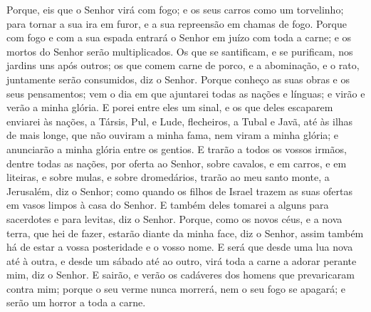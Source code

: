 Porque, eis que o Senhor virá com fogo; e os seus carros como um
torvelinho; para tornar a sua ira em furor, e a sua repreensão em
chamas de fogo. Porque com fogo e com a sua espada entrará o
Senhor em juízo com toda a carne; e os mortos do Senhor serão
multiplicados. Os que se santificam, e se purificam, nos
jardins uns após outros; os que comem carne de porco, e a
abominação, e o rato, juntamente serão consumidos, diz o Senhor.
Porque conheço as suas obras e os seus pensamentos; vem o dia
em que ajuntarei todas as nações e línguas; e virão e verão a minha
glória. E porei entre eles um sinal, e os que deles escaparem
enviarei às nações, a Társis, Pul, e Lude, flecheiros, a Tubal e
Javã, até às ilhas de mais longe, que não ouviram a minha fama, nem
viram a minha glória; e anunciarão a minha glória entre os gentios.
E trarão a todos os vossos irmãos, dentre todas as nações,
por oferta ao Senhor, sobre cavalos, e em carros, e em liteiras, e
sobre mulas, e sobre dromedários, trarão ao meu santo monte, a
Jerusalém, diz o Senhor; como quando os filhos de Israel trazem as
suas ofertas em vasos limpos à casa do Senhor. E também deles
tomarei a alguns para sacerdotes e para levitas, diz o Senhor.
Porque, como os novos céus, e a nova terra, que hei de fazer,
estarão diante da minha face, diz o Senhor, assim também há de estar
a vossa posteridade e o vosso nome. E será que desde uma lua
nova até à outra, e desde um sábado até ao outro, virá toda a carne
a adorar perante mim, diz o Senhor. E sairão, e verão os
cadáveres dos homens que prevaricaram contra mim; porque o seu verme
nunca morrerá, nem o seu fogo se apagará; e serão um horror a toda a
carne.

